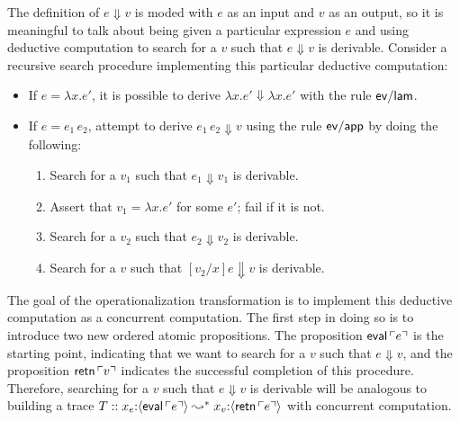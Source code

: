 The definition of $e \Downarrow v$ is moded with $e$ as an input and
$v$ as an output, so it is meaningful to talk about being given a
particular expression $e$ and using deductive computation to search
for a $v$ such that $e \Downarrow v$ is derivable.  Consider a
recursive search procedure implementing this particular deductive
computation:
\begin{itemize}
\item
      If $e = \lambda x. e'$, 
      it is possible to derive 
      $\lambda x. e' \Downarrow \lambda x. e'$
      with the rule ${\sf ev/lam}$.
\item
       If $e = e_1\,e_2$,
       attempt to derive 
       $e_1\,e_2 \Downarrow v$
       using the rule ${\sf ev/app}$ by doing the following:
    \begin{enumerate}
    \item Search for a $v_1$ such that 
          $e_1 \Downarrow v_1$ is derivable.
    \item Assert that $v_1 = \lambda x.e'$ for some
          $e'$; fail if it is not.
    \item Search for a $v_2$ such that 
          $e_2 \Downarrow v_2$ is derivable.
    \item Search for a $v$ such that 
          $[v_2/x]e \Downarrow v$ is derivable.
    \end{enumerate}
\end{itemize}
%
The goal of the operationalization transformation is to implement this
deductive computation as a concurrent computation. The first step in
doing so is to introduce two new ordered atomic propositions.  The
proposition ${\sf eval}\,{\ulcorner{e}\urcorner}$ is the starting point, indicating
that we want to search for a $v$ such that $e \Downarrow v$, and the
proposition ${\sf retn}\,{\ulcorner{v}\urcorner}$ indicates the successful
completion of this procedure. Therefore, searching for a $v$ such that
$e \Downarrow v$ is derivable will be analogous to building a trace $T
:: x_e{:}\langle {{\sf eval}\,{\ulcorner{e}\urcorner}} \rangle \leadsto^* x_v{:}\langle {{\sf
    retn}\,{\ulcorner{e}\urcorner}} \rangle$ with concurrent computation.

